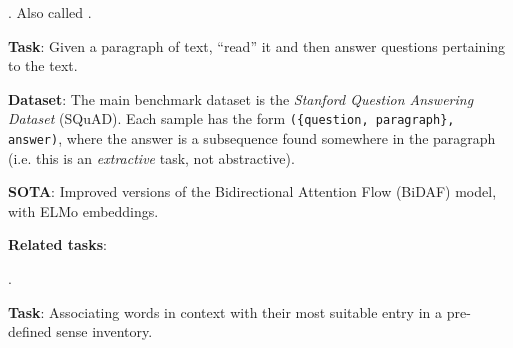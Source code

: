 \documentclass[11pt]{article}
\begin{document}
\myspace
\p {}. Also called . 
\begin{compactitem}
	\item \textbf{Task}: Given a paragraph of text, ``read'' it and then answer questions pertaining to the text. 
	
	\item \textbf{Dataset}: The main benchmark dataset is the \textit{Stanford Question Answering Dataset} (SQuAD). Each sample has the form \texttt{(\{question, paragraph\}, answer)}, where the answer is a subsequence found somewhere in the paragraph (i.e. this is an \textit{extractive} task, not abstractive).
	
	\item \textbf{SOTA}: Improved versions of the Bidirectional Attention Flow (BiDAF) model, with ELMo embeddings.
	
	\item \textbf{Related tasks}:
\end{compactitem}

\myspace
\p {}. 
\begin{compactitem}
	\item \textbf{Task}: Associating words in context with their most suitable entry in a pre-defined sense inventory.
\end{compactitem}



\myspace
{}
\myspace
\end{document}

